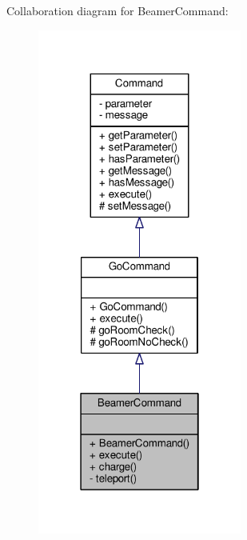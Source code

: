 Collaboration diagram for Beamer\-Command\-:
\nopagebreak
\begin{figure}[H]
\begin{center}
\leavevmode
\includegraphics[width=190pt]{classBeamerCommand__coll__graph}
\end{center}
\end{figure}
